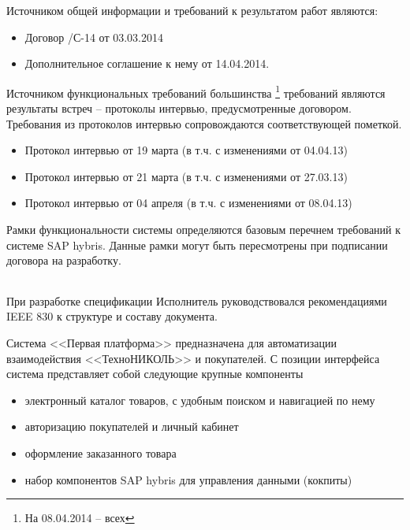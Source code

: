 
Источником общей информации и требований к результатом работ являются:
\begin{itemize}
\item Договор /С-14 от 03.03.2014
\item Дополнительное соглашение к нему  от 14.04.2014. 
\end{itemize}

Источником функциональных требований большинства \footnote{На 08.04.2014 -- всех} требований являются результаты встреч -- протоколы интервью, предусмотренные договором. Требования из протоколов интервью сопровождаются соответствующей пометкой. 

\begin{itemize}
\item Протокол интервью от 19 марта (в т.ч. с изменениями от 04.04.13)
\item Протокол интервью от 21 марта (в т.ч. с изменениями от 27.03.13)
\item Протокол интервью от 04 апреля (в т.ч. с изменениями от 08.04.13)
\end{itemize}


Рамки функциональности системы определяются базовым перечнем требований к системе SAP hybris. Данные рамки могут быть пересмотрены при подписании договора на разработку. 

\begin{longtable}{|p{}|p{}|}

\end{longtable}



При разработке спецификации Исполнитель руководствовался рекомендациями IEEE 830 к структуре и составу документа.


Система <<Первая платформа>> предназначена для автоматизации взаимодействия <<ТехноНИКОЛЬ>> и покупателей. С позиции интерфейса система представляет собой следующие крупные компоненты 
\begin{itemize}
\item электронный каталог товаров, с удобным поиском и навигацией по нему 
\item авторизацию покупателей и личный кабинет
\item оформление заказанного товара
\item набор компонентов SAP hybris для управления данными (кокпиты)
\end{itemize}

